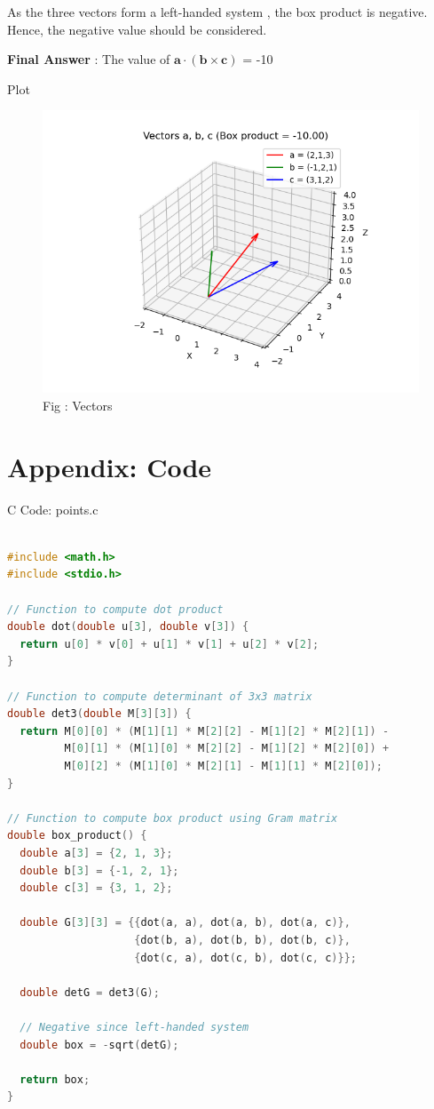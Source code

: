 \documentclass{beamer}
\numberwithin{equation}{section}
\theoremstyle{remark}
\let\vec\mathbf
\begin{document}
\begin{frame}

As the three vectors form a left-handed system , the box product is negative. Hence, the negative value should be considered.

\textbf{Final Answer} : The value of \(\vec{a}\cdot(\vec{b}\times\vec{c})\) = -10
 


\end{frame}

\begin{frame}{Plot}
\begin{figure}[h!]
  \centering
  \includegraphics[width=0.6\columnwidth]{figs/vectors.png} 
   \caption*{Fig : Vectors}
  \label{Fig1}
\end{figure}

\end{frame}

\section*{Appendix: Code}

\begin{frame}[fragile]{C Code: points.c}
\begin{lstlisting}[language=C]

#include <math.h>
#include <stdio.h>

// Function to compute dot product
double dot(double u[3], double v[3]) {
  return u[0] * v[0] + u[1] * v[1] + u[2] * v[2];
}

// Function to compute determinant of 3x3 matrix
double det3(double M[3][3]) {
  return M[0][0] * (M[1][1] * M[2][2] - M[1][2] * M[2][1]) -
         M[0][1] * (M[1][0] * M[2][2] - M[1][2] * M[2][0]) +
         M[0][2] * (M[1][0] * M[2][1] - M[1][1] * M[2][0]);
}

// Function to compute box product using Gram matrix
double box_product() {
  double a[3] = {2, 1, 3};
  double b[3] = {-1, 2, 1};
  double c[3] = {3, 1, 2};

  double G[3][3] = {{dot(a, a), dot(a, b), dot(a, c)},
                    {dot(b, a), dot(b, b), dot(b, c)},
                    {dot(c, a), dot(c, b), dot(c, c)}};

  double detG = det3(G);

  // Negative since left-handed system
  double box = -sqrt(detG);

  return box;
}

\end{lstlisting}
\end{frame}
\end{document}
